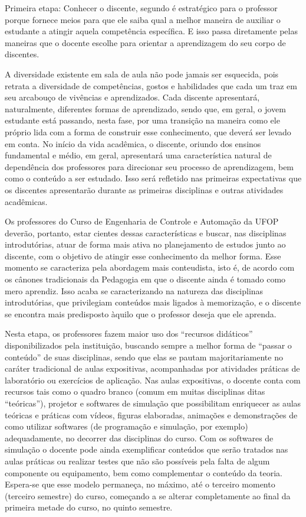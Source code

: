 \documentclass[
	12pt,				%
	openright,			%
	oneside,			%
	a4paper,			%
	english,			%
	brazil				%
	]{abntex2}
\begin{document}
Primeira etapa: Conhecer o discente, segundo \textcite{gaeta} é estratégico para o professor porque fornece meios para que ele saiba qual a melhor maneira de auxiliar o estudante a atingir aquela competência específica. E isso passa diretamente pelas maneiras que o docente escolhe para orientar a aprendizagem do seu corpo de discentes.

A diversidade existente em sala de aula não pode jamais ser esquecida, pois retrata a diversidade de competências, gostos e habilidades que cada um traz em seu arcabouço de vivências e aprendizados. Cada discente apresentará, naturalmente, diferentes formas de aprendizado, sendo que, em geral, o jovem estudante está passando, nesta fase, por uma transição na maneira como ele próprio lida com a forma de construir esse conhecimento, que deverá ser levado em conta. No início da vida acadêmica, o discente, oriundo dos ensinos fundamental e médio, em geral, apresentará uma característica natural de dependência dos professores para direcionar seu processo de aprendizagem, bem como o conteúdo a ser estudado. Isso será refletido nas primeiras expectativas que os discentes apresentarão durante as primeiras disciplinas e outras atividades acadêmicas.

Os professores do Curso de Engenharia de Controle e Automação da UFOP deverão, portanto, estar cientes dessas características e buscar, nas disciplinas introdutórias, atuar de forma mais ativa no planejamento de estudos junto ao discente, com o objetivo de atingir esse conhecimento da melhor forma. Esse momento se caracteriza pela abordagem mais conteudista, isto é, de acordo com os cânones tradicionais da Pedagogia em que o discente ainda é tomado como mero aprendiz. Isso acaba se caracterizando na natureza das disciplinas introdutórias, que privilegiam conteúdos mais ligados à memorização, e o discente se encontra mais predisposto àquilo que o professor deseja que ele aprenda.

Nesta etapa, os professores fazem maior uso dos “recursos didáticos” disponibilizados pela instituição, buscando sempre a melhor forma de “passar o conteúdo” de suas disciplinas, sendo que elas se pautam majoritariamente no caráter tradicional de aulas expositivas, acompanhadas por atividades práticas de laboratório ou exercícios de aplicação. Nas aulas expositivas, o docente conta com recursos tais como o quadro branco (comum em muitas disciplinas ditas “teóricas”), projetor e softwares de simulação que possibilitam enriquecer as aulas teóricas e práticas com vídeos, figuras elaboradas, animações e demonstrações de como utilizar softwares (de programação e simulação, por exemplo) adequadamente, no decorrer das disciplinas do curso. Com os softwares de simulação o docente pode ainda exemplificar conteúdos que serão tratados nas aulas práticas ou realizar testes que não são possíveis pela falta de algum componente ou equipamento, bem como complementar o conteúdo da teoria. Espera-se que esse modelo permaneça, no máximo, até o terceiro momento (terceiro semestre) do curso, começando a se alterar completamente ao final da primeira metade do curso, no quinto semestre.
\end{document}
